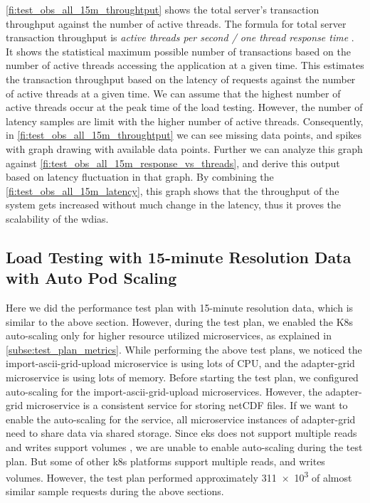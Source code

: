 \cref{fi:test_obs_all_15m_throughtput} shows the total server's transaction throughput against the number of active threads.
The formula for total server transaction throughput is \emph{active threads per second / one thread response time} \cite{ApacheSoftwareFoundationJMeter:Plugin}.
It shows the statistical maximum possible number of transactions based on the number of active threads accessing the application at a given time. This estimates the transaction throughput based on the latency of requests against the number of active threads at a given time. We can assume that the highest number of active threads occur at the peak time of the load testing. However, the number of latency samples are limit with the higher number of active threads. Consequently, in \cref{fi:test_obs_all_15m_throughtput} we can see missing data points, and spikes with graph drawing with available data points. Further we can analyze this graph against \cref{fi:test_obs_all_15m_response_vs_threads}, and derive this output based on latency fluctuation in that graph. By combining the \cref{fi:test_obs_all_15m_latency}, this graph shows that the throughput of the system gets increased without much change in the latency, thus it proves the scalability of the \acrshort{wdias}.


\subsection{Load Testing with 15-minute Resolution Data with Auto Pod Scaling}
\label{subse:obs_test_plan_all_auto_15min}

Here we did the performance test plan with 15-minute resolution data, which is similar to the above section. However, during the test plan, we enabled the K8s auto-scaling only for higher resource utilized microservices, as explained in \cref{subse:test_plan_metrics}. While performing the above test plans, we noticed the import-ascii-grid-upload microservice is using lots of CPU, and the adapter-grid microservice is using lots of memory. Before starting the test plan, we configured auto-scaling for the import-ascii-grid-upload microservices. However, the adapter-grid microservice is a consistent service for storing netCDF files. If we want to enable the auto-scaling for the service, all microservice instances of adapter-grid need to share data via shared storage. Since \acrshort{eks} does not support multiple reads and writes support volumes \cite{LinuxFoundationKubernetesVolumes}, we are unable to enable auto-scaling during the test plan. But some of other \acrshort{k8s} platforms support multiple reads, and writes volumes. However, the test plan performed approximately \num{311e3} of almost similar sample requests during the above sections.

